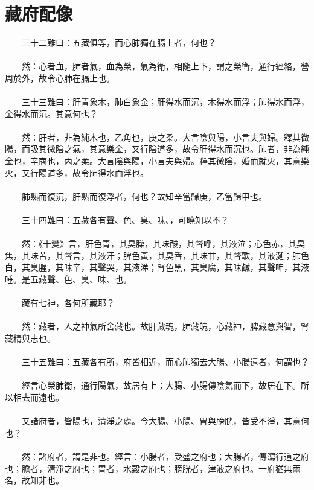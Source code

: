 \section{藏府配像}

　　三十二難曰：五藏俱等，而心肺獨在膈上者，何也？
\\\\
　　然：心者血，肺者氣，血為榮，氣為衛，相隨上下，謂之榮衛，通行經絡，營周於外，故令心肺在膈上也。
\\\\
　　三十三難曰：肝青象木，肺白象金；肝得水而沉，木得水而浮；肺得水而浮，金得水而沉。其意何也？
\\\\
　　然：肝者，非為純木也，乙角也，庚之柔。大言陰與陽，小言夫與婦。釋其微陽，而吸其微陰之氣，其意樂金，又行陰道多，故令肝得水而沉也。肺者，非為純金也，辛商也，丙之柔。大言陰與陽，小言夫與婦。釋其微陰，婚而就火，其意樂火，又行陽道多，故令肺得水而浮也。
\\\\
　　肺熟而復沉，肝熟而復浮者，何也？故知辛當歸庚，乙當歸甲也。
\\\\
　　三十四難曰：五藏各有聲、色、臭、味、，可曉知以不？
\\\\
　　然：《十變》言，肝色青，其臭臊，其味酸，其聲呼，其液泣；心色赤，其臭焦，其味苦，其聲言，其液汗；脾色黃，其臭香，其味甘，其聲歌，其液涎；肺色白，其臭腥，其味辛，其聲哭，其液涕；腎色黑，其臭腐，其味鹹，其聲呻，其液唾。是五藏聲、色、臭、味、也。
\\\\
　　藏有七神，各何所藏耶？
\\\\
　　然：藏者，人之神氣所舍藏也。故肝藏魂，肺藏魄，心藏神，脾藏意與智，腎藏精與志也。
\\\\
　　三十五難曰：五藏各有所，府皆相近，而心肺獨去大腸、小腸遠者，何謂也？
\\\\
　　經言心榮肺衛，通行陽氣，故居有上；大腸、小腸傳陰氣而下，故居在下。所以相去而遠也。
\\\\
　　又諸府者，皆陽也，清淨之處。今大腸、小腸、胃與膀胱，皆受不淨，其意何也？
\\\\
　　然：諸府者，謂是非也。經言：小腸者，受盛之府也；大腸者，傳瀉行道之府也；膽者，清淨之府也；胃者，水穀之府也；膀胱者，津液之府也。一府猶無兩名，故知非也。
